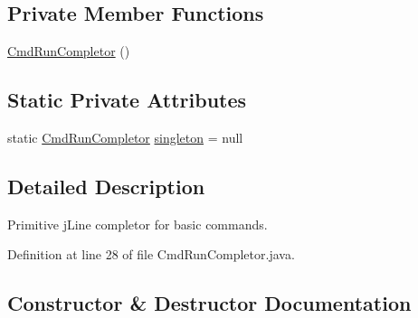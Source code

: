 \subsection*{Private Member Functions}
\begin{DoxyCompactItemize}
\item 
\hyperlink{classgov_1_1nasa_1_1jpf_1_1inspector_1_1frontends_1_1jpfshell_1_1commands_1_1completors_1_1_cmd_run_completor_a09ccf244b9103972d583d324cea02214}{Cmd\+Run\+Completor} ()
\end{DoxyCompactItemize}
\subsection*{Static Private Attributes}
\begin{DoxyCompactItemize}
\item 
static \hyperlink{classgov_1_1nasa_1_1jpf_1_1inspector_1_1frontends_1_1jpfshell_1_1commands_1_1completors_1_1_cmd_run_completor}{Cmd\+Run\+Completor} \hyperlink{classgov_1_1nasa_1_1jpf_1_1inspector_1_1frontends_1_1jpfshell_1_1commands_1_1completors_1_1_cmd_run_completor_ab9dfa61331cad662287fb66da080067f}{singleton} = null
\end{DoxyCompactItemize}


\subsection{Detailed Description}
Primitive j\+Line completor for basic commands. 

Definition at line 28 of file Cmd\+Run\+Completor.\+java.



\subsection{Constructor \& Destructor Documentation}
